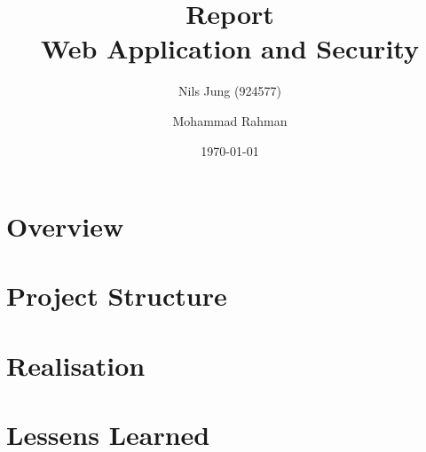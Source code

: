 \documentclass[a4paper]{spie}
\begin{document}
\title{Report \\ {Web Application and Security}}

\author{Nils Jung (924577) \and Mohammad Rahman}
\date{\today}
\maketitle
\newpage
\tableofcontents
\newpage

\section{Overview}
\cite{Alred03}
\section{Project Structure}
\section{Realisation}
\section{Lessens Learned}
\newpage


\end{document}
